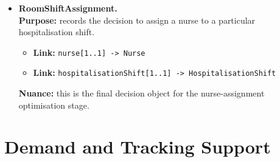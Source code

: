 \documentclass[10pt]{article}
\newcommand{\clabel}[1]{{\large\bfseries #1}}
\begin{document}
\begin{itemize}
    \item \clabel{RoomShiftAssignment.}\\
    \textbf{Purpose:} records the decision to assign a nurse to a particular hospitalisation shift.
    \begin{itemize}
        \item \textbf{Link:} \texttt{nurse[1..1] -> Nurse}
        \item \textbf{Link:} \texttt{hospitalisationShift[1..1] -> HospitalisationShift}
    \end{itemize}
    \textbf{Nuance:} this is the final decision object for the nurse-assignment optimisation stage.
\end{itemize}

\section*{Demand and Tracking Support}
\end{document}

